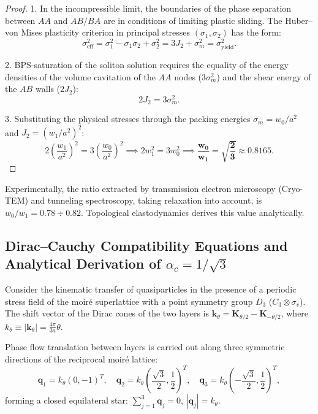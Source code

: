 \documentclass[12pt,a4paper]{article}
\begin{document}
	\begin{proof}
		1. In the incompressible limit, the boundaries of the phase separation between $AA$ and $AB/BA$ are in conditions of limiting plastic sliding. The Huber--von Mises plasticity criterion in principal stresses $(\sigma_1, \sigma_2)$ has the form:
		\begin{equation}
			\sigma_{\text{eff}}^2 = \sigma_1^2 - \sigma_1 \sigma_2 + \sigma_2^2 = 3 J_2 + \sigma_m^2 = \sigma_{\text{yield}}^2.
		\end{equation}
		
		2. BPS-saturation of the soliton solution requires the equality of the energy densities of the volume cavitation of the $AA$ nodes ($3\sigma_m^2$) and the shear energy of the $AB$ walls ($2J_2$):
		\begin{equation}
			2 J_2 = 3 \sigma_m^2.
		\end{equation}
		
		3. Substituting the physical stresses through the packing energies $\sigma_m = w_0 / a^2$ and $J_2 = (w_1 / a^2)^2$:
		\begin{equation}
			2 \left( \frac{w_1}{a^2} \right)^2 = 3 \left( \frac{w_0}{a^2} \right)^2 \implies 2 w_1^2 = 3 w_0^2 \implies \mathbf{\frac{w_0}{w_1} = \sqrt{\frac{2}{3}} \approx 0.8165}.
		\end{equation}
	\end{proof}
	
	Experimentally, the ratio extracted by transmission electron microscopy (Cryo-TEM) and tunneling spectroscopy, taking relaxation into account, is $w_0/w_1 = 0.78 \div 0.82$. Topological elastodynamics derives this value analytically.
	
	\subsection{Dirac--Cauchy Compatibility Equations and Analytical Derivation of $\alpha_c = 1/\sqrt{3}$}
	
	Consider the kinematic transfer of quasiparticles in the presence of a periodic stress field of the moiré superlattice with a point symmetry group $D_3$ ($C_3 \otimes \sigma_v$). The shift vector of the Dirac cones of the two layers is $\mathbf{k}_\theta = \mathbf{K}_{\theta/2} - \mathbf{K}_{-\theta/2}$, where $k_\theta \equiv |\mathbf{k}_\theta| = \frac{4\pi}{3 a} \theta$.
	
	Phase flow translation between layers is carried out along three symmetric directions of the reciprocal moiré lattice:
	\begin{equation}
		\mathbf{q}_1 = k_\theta (0, -1)^T, \quad \mathbf{q}_2 = k_\theta \left(\frac{\sqrt{3}}{2}, \frac{1}{2}\right)^T, \quad \mathbf{q}_3 = k_\theta \left(-\frac{\sqrt{3}}{2}, \frac{1}{2}\right)^T,
	\end{equation}
	forming a closed equilateral star: $\sum_{j=1}^3 \mathbf{q}_j = 0$, $|\mathbf{q}_j| = k_\theta$.
	
\end{document}

